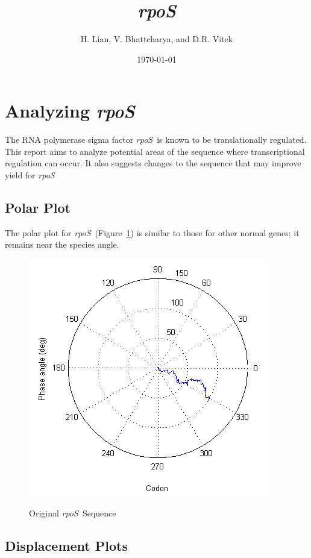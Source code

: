 \documentclass[10pt,twocolumn]{article}
\newcommand{\rpoS}{\emph{rpoS}}
\begin{document}
\title{{\bf \rpoS}}
\author{{\sc H. Lian, V. Bhattcharya, and D.R. Vitek}}
\date{{\sc \today}}
\maketitle

\section{Analyzing \rpoS}

The RNA polymerase sigma factor \rpoS\ is known to be translationally regulated.
This report aims to analyze potential areas of the sequence where transcriptional regulation can occur.
It also suggests changes to the sequence that may improve yield for \rpoS\.

\subsection{Polar Plot}

The polar plot for \rpoS\ (Figure~\ref{rpos:polar}) is similar to those for other normal genes; 
it remains near the species angle.

\begin{figure}[htp]
    \centering
    \caption{Original \rpoS\ Sequence}
    \label{rpos:polar}
    {\includegraphics[scale=0.7]{rpoS_polar.png}}
\end{figure}

\subsection{Displacement Plots}
\end{document}
